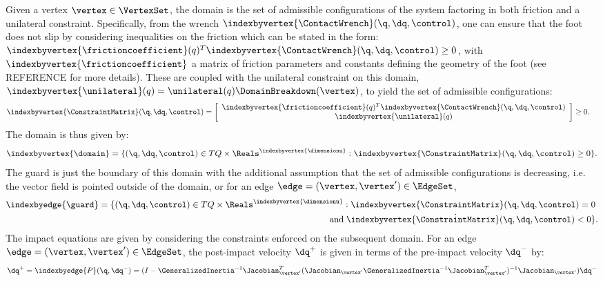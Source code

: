 Given a vertex $\vertex \in \VertexSet$, the domain is the set of admissible configurations of the system factoring in both friction and a unilateral constraint. Specifically, from the wrench $\indexbyvertex{\ContactWrench} (\q,\dq,\control)$, one can ensure that the foot does not slip by considering inequalities on the friction which can be stated in the form: $\indexbyvertex{\frictioncoefficient}(q)^T \indexbyvertex{\ContactWrench}(\q,\dq,\control) \geq 0$, with $\indexbyvertex{\frictioncoefficient}$ a matrix of friction parameters and constants defining the geometry of the foot (see REFERENCE for more details). These are coupled with the unilateral constraint on this domain, $\indexbyvertex{\unilateral}(q) = \unilateral(q) \DomainBreakdown(\vertex)$, to yield the set of admissible configurations:
\begin{align}
\indexbyvertex{\ConstraintMatrix}(\q,\dq,\control) &= \left[
  \begin{array}{c}
    \indexbyvertex{\frictioncoefficient}(q)^T \indexbyvertex{\ContactWrench}(\q,\dq,\control) \\
    \indexbyvertex{\unilateral}(q)
  \end{array}
  \right] \geq 0.
\end{align}
The domain is thus given by:
\begin{align}
 \indexbyvertex{\domain} = \{ (\q,\dq,\control) \in TQ \times \Reals^{\indexbyvertex{\dimensionu}} : \indexbyvertex{\ConstraintMatrix}(\q,\dq,\control) \geq 0 \}.
\end{align}
The guard is just the boundary of this domain with the additional assumption that the set of admissible configurations is decreasing, i.e. the vector field is pointed outside of the domain, or for an edge $\edge =(\vertex, \vertex') \in \EdgeSet$,
\begin{align}
 \indexbyedge{\guard} = \{ (\q,\dq,\control) \in TQ \times \Reals^{\indexbyvertex{\dimensionu}} : \indexbyvertex{\ConstraintMatrix}(\q,\dq,\control) = 0 \hspace{1mm} \\
  \nonumber \text{and} \hspace{1mm} \indexbyvertex{\dot \ConstraintMatrix}(\q,\dq,\control) < 0\}.
\end{align}
The impact equations are given by considering the constraints enforced on the subsequent domain. For an edge $\edge = (\vertex, \vertex') \in \EdgeSet$, the post-impact velocity $\dq^+$ is given in terms of the pre-impact velocity $\dq^-$ by:
\begin{align}
 \dq^+ = \indexbyedge{P}(\q, \dq^-) = (I - \GeneralizedInertia^{-1} \Jacobian_{\vertex'}^T (\Jacobian_{\vertex'} \GeneralizedInertia^{-1} \Jacobian_{\vertex'}^T)^{-1} \Jacobian_{\vertex'}) \dq^-
\end{align}
